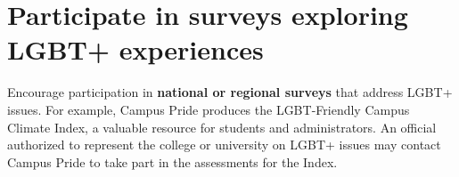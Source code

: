 \section {Participate in surveys exploring LGBT+ experiences}
\label{univ-surveys}
Encourage participation in \textbf{national or regional surveys} that address LGBT+ issues. For example, Campus Pride produces the LGBT-Friendly Campus Climate Index, a valuable resource for students and administrators. An official authorized to represent the college or university on LGBT+ issues may contact Campus Pride to take part in the assessments for the Index.


















